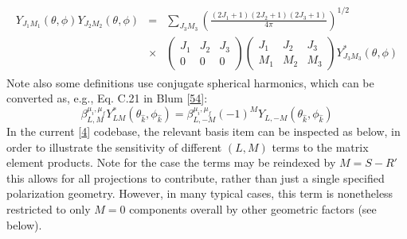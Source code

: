\documentclass[letterpaper,table,10pt,english]{jupyterBook}
\begin{document}
\begin{equation*}
\begin{split}
\begin{aligned}
Y_{J_{1}M_{1}}(\theta,\phi)Y_{J_{2}M_{2}}(\theta,\phi) & = & \sum_{J_{3}M_{3}}\left(\frac{(2J_{1}+1)(2J_{2}+1)(2J_{3}+1)}{4\pi}\right)^{1/2}\\
 & \times & \left(\begin{array}{ccc}
J_{1} & J_{2} & J_{3}\\
0 & 0 & 0
\end{array}\right)\left(\begin{array}{ccc}
J_{1} & J_{2} & J_{3}\\
M_{1} & M_{2} & M_{3}
\end{array}\right)Y_{J_{3}M_{3}}^{*}(\theta,\phi)
\end{aligned}
\end{split}
\end{equation*}
\sphinxAtStartPar
Note also some definitions use conjugate spherical harmonics, which can be converted as, e.g., Eq. C.21 in Blum {[}\hyperlink{cite.backmatter/bibliography:id479}{54}{]}:
\label{equation:part1/theory_tensor_formalism_201122:4929e330-00f8-4cc2-a463-aebfe3d93a15}\begin{equation}
\beta_{L,M}^{\mu_{i},\mu_{f}}Y_{LM}^{*}(\theta_{\hat{k}},\phi_{\hat{k}})=\beta_{L,-M}^{\mu_{i},\mu_{f}}(-1)^{M}Y_{L,-M}(\theta_{\hat{k}},\phi_{\hat{k}})\label{eq:sph-conj-conv}
\end{equation}
\sphinxAtStartPar
In the current  {[}\hyperlink{cite.backmatter/bibliography:id618}{4}{]} codebase, the relevant basis item can be inspected as below, in order to illustrate the sensitivity of different \((L,M)\) terms to the matrix element products. Note for the {\hyperref[\detokenize{backmatter/glossary:term-AF}]{}} case the terms may be reindexed by \(M=S-R'\) \sphinxhyphen{} this allows for all {\hyperref[\detokenize{backmatter/glossary:term-MF}]{}} projections to contribute, rather than just a single specified polarization geometry. However, in many typical cases, this term is nonetheless restricted to only \(M=0\) components overall by other geometric factors (see below).
\end{document}
